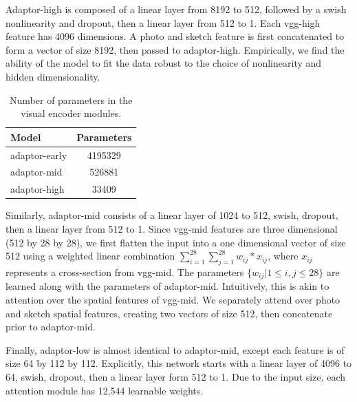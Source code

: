 \documentclass[9pt,twocolumn,twoside]{pnas-new}
\begin{document}
{Adaptor-high is composed of a linear layer from 8192 to 512, followed by a swish nonlinearity \cite[]{ramachandran2018searching} and dropout, then a linear layer from 512 to 1. Each vgg-high feature has 4096 dimensions. A photo and sketch feature is first concatenated to form a vector of size 8192, then passed to adaptor-high. Empirically, we find the ability of the model to fit the data robust to the choice of nonlinearity and hidden dimensionality. 

\begin{table}
\centering
\begin{tabular}{| l | c |}
\hline
Model & Parameters \\
\hline
\hline 
adaptor-early & 4195329 \\ 
\hline
adaptor-mid & 526881 \\  
\hline
adaptor-high & 33409 \\
\hline
\end{tabular}
\caption{Number of parameters in the visual encoder modules.}
\label{table:parameters}
\end{table}

Similarly, adaptor-mid consists of a linear layer of 1024 to 512, swish, dropout, then a linear layer from 512 to 1. Since vgg-mid features are three dimensional (512 by 28 by 28), we first flatten the input into a one dimensional vector of size 512 using a weighted linear combination $\sum_{i=1}^{28}\sum_{j=1}^{28} w_{ij} * x_{ij}$, where $x_{ij}$ represents a cross-section from vgg-mid. The parameters $\{w_{ij}|1\leq i,j \leq 28\}$ are learned along with the parameters of adaptor-mid. Intuitively, this is akin to attention over the spatial features of vgg-mid. We separately attend over photo and sketch spatial features, creating two vectors of size 512, then concatenate prior to adaptor-mid.

Finally, adaptor-low is almost identical to adaptor-mid, except each feature is of size 64 by 112 by 112. Explicitly, this network starts with a linear layer of 4096 to 64, swish, dropout, then a linear layer form 512 to 1. Due to the input size, each attention module has 12,544 learnable weights. 

}
\end{document}
